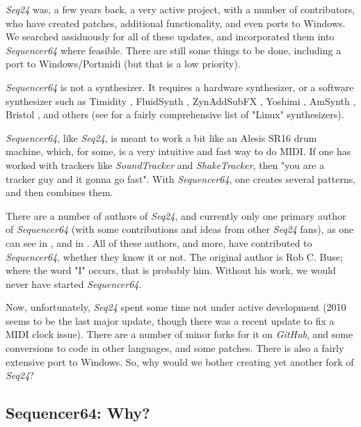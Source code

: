 \documentclass[
 11pt,
 twoside,
 a4paper,
 headinclude,
 footinclude,
 final                                 %
]{article}
\begin{document}
   \textsl{Seq24} was, a few years back, a very active project, with a
   number of contributors, who have created patches, additional
   functionality, and even ports to Windows.
   We searched assiduously for all of these updates, and
   incorporated them into \textsl{Sequencer64} where feasible.
   There are still some things to be done, including a port to
   Windows/Portmidi (but that is a low priority).

   \textsl{Sequencer64} is not a synthesizer.  It requires a hardware
   synthesizer, or a software synthesizer such as Timidity \cite{timidity},
   FluidSynth \cite{fluidsynth}, ZynAddSubFX \cite{zynaddsubfx}, Yoshimi
   \cite{yoshimi} \cite{yoshimi2}, AmSynth \cite{amsynth}, Bristol
   \cite{bristol}, and others (see \cite{linuxsynths} for a fairly
   comprehensive list of "Linux" synthesizers).

   \textsl{Sequencer64}, like \textsl{Seq24},
   is meant to work a bit like an Alesis SR16 drum machine,
   which, for some, is a very intuitive and fast way to do MIDI.
   If one has worked with trackers like \textsl{SoundTracker} and
   \textsl{ShakeTracker}, then "you are a tracker guy and it gonna go fast".
   With \textsl{Sequencer64}, one creates several patterns, and then
   combines them.

   There are a number of authors of \textsl{Seq24}, and currently only
   one primary author of \textsl{Sequencer64} (with some contributions and
   ideas from other \textsl{Seq24} fans),
   as one can see in ,
   and in .
   All of these authors, and more, have contributed to \textsl{Sequencer64},
   whether they know it or not.
   The original author is Rob C. Buse; where the word "I" occurs, that is
   probably him.  Without his work, we would never have started
   \textsl{Sequencer64}.

   Now, unfortunately, \textsl{Seq24} spent some time not under active
   development (2010 seems to be the last major update, though there was a
   recent update to fix a MIDI clock issue).  There are a number of
   minor forks for it on \textsl{GitHub}, and some conversions
   to code in other languages, and some patches.
   There is also a fairly extensive port to Windows.
   So, why would we bother creating yet another fork of \textsl{Seq24}?

\subsection{Sequencer64: Why?}
\label{subsec:introduction_seq64_vs_others}
\end{document}
